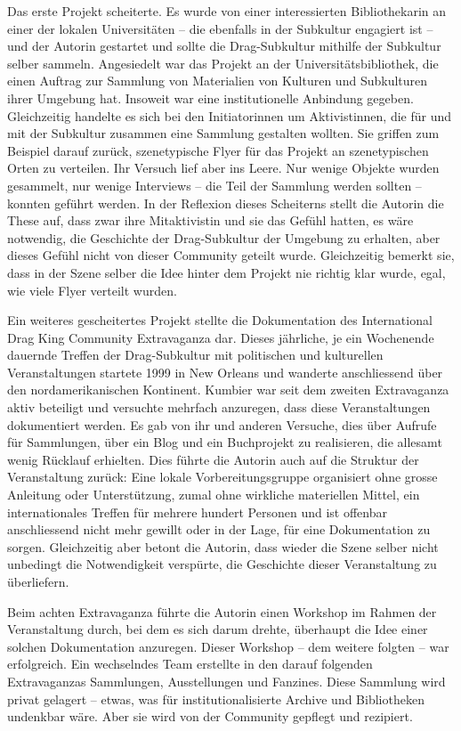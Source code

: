 \documentclass[a4paper,
fontsize=11pt,
oneside,
numbers=noperiodatend,
parskip=half-,
bibliography=totoc,
final
]{scrartcl}
\begin{document}
Das erste Projekt scheiterte. Es wurde von einer interessierten
Bibliothekarin an einer der lokalen Universitäten -- die ebenfalls in
der Subkultur engagiert ist -- und der Autorin gestartet und sollte die
Drag-Subkultur mithilfe der Subkultur selber sammeln. Angesiedelt war
das Projekt an der Universitätsbibliothek, die einen Auftrag zur
Sammlung von Materialien von Kulturen und Subkulturen ihrer Umgebung
hat. Insoweit war eine institutionelle Anbindung gegeben. Gleichzeitig
handelte es sich bei den Initiatorinnen um Aktivistinnen, die für und
mit der Subkultur zusammen eine Sammlung gestalten wollten. Sie griffen
zum Beispiel darauf zurück, szenetypische Flyer für das Projekt an
szenetypischen Orten zu verteilen. Ihr Versuch lief aber ins Leere. Nur
wenige Objekte wurden gesammelt, nur wenige Interviews -- die Teil der
Sammlung werden sollten -- konnten geführt werden. In der Reflexion
dieses Scheiterns stellt die Autorin die These auf, dass zwar ihre
Mitaktivistin und sie das Gefühl hatten, es wäre notwendig, die
Geschichte der Drag-Subkultur der Umgebung zu erhalten, aber dieses
Gefühl nicht von dieser Community geteilt wurde. Gleichzeitig bemerkt
sie, dass in der Szene selber die Idee hinter dem Projekt nie richtig
klar wurde, egal, wie viele Flyer verteilt wurden.

Ein weiteres gescheitertes Projekt stellte die Dokumentation des
International Drag King Community Extravaganza dar. Dieses jährliche, je
ein Wochenende dauernde Treffen der Drag-Subkultur mit politischen und
kulturellen Veranstaltungen startete 1999 in New Orleans und wanderte
anschliessend über den nordamerikanischen Kontinent. Kumbier war seit
dem zweiten Extravaganza aktiv beteiligt und versuchte mehrfach
anzuregen, dass diese Veranstaltungen dokumentiert werden. Es gab von
ihr und anderen Versuche, dies über Aufrufe für Sammlungen, über ein
Blog und ein Buchprojekt zu realisieren, die allesamt wenig Rücklauf
erhielten. Dies führte die Autorin auch auf die Struktur der
Veranstaltung zurück: Eine lokale Vorbereitungsgruppe organisiert ohne
grosse Anleitung oder Unterstützung, zumal ohne wirkliche materiellen
Mittel, ein internationales Treffen für mehrere hundert Personen und ist
offenbar anschliessend nicht mehr gewillt oder in der Lage, für eine
Dokumentation zu sorgen. Gleichzeitig aber betont die Autorin, dass
wieder die Szene selber nicht unbedingt die Notwendigkeit verspürte, die
Geschichte dieser Veranstaltung zu überliefern.

Beim achten Extravaganza führte die Autorin einen Workshop im Rahmen der
Veranstaltung durch, bei dem es sich darum drehte, überhaupt die Idee
einer solchen Dokumentation anzuregen. Dieser Workshop -- dem weitere
folgten -- war erfolgreich. Ein wechselndes Team erstellte in den darauf
folgenden Extravaganzas Sammlungen, Ausstellungen und Fanzines. Diese
Sammlung wird privat gelagert -- etwas, was für institutionalisierte
Archive und Bibliotheken undenkbar wäre. Aber sie wird von der Community
gepflegt und rezipiert.
\end{document}
